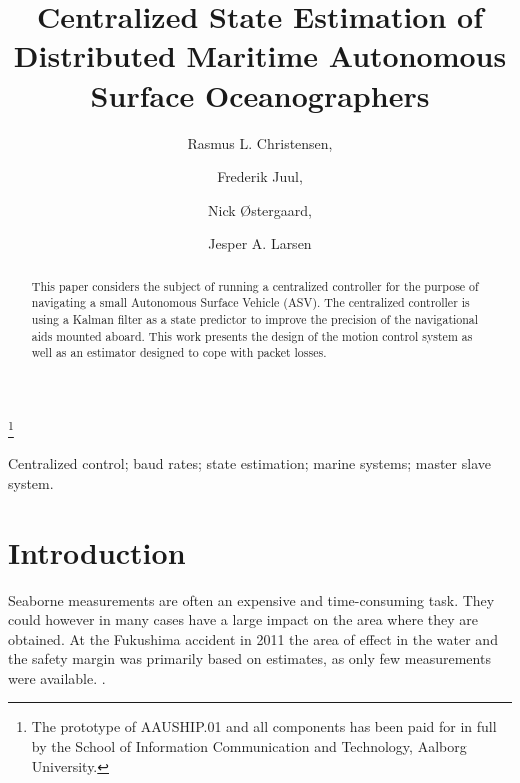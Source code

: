 \documentclass{ifacconf}
\begin{document}
\begin{frontmatter}

\title{Centralized State Estimation of Distributed Maritime Autonomous Surface Oceanographers} %

\thanks[footnoteinfo]{The prototype of AAUSHIP.01 and all components has been paid for in full by the School of Information Communication and Technology, Aalborg University.}

\author{Rasmus L. Christensen,} 
\author{Frederik Juul,} 
\author{Nick \O stergaard,}
\author{Jesper A. Larsen}
\address{Section of Automation and Control, Department of Electronic Systems, Aalborg University, Fredrik Bajers Vej 7, 9220 Aalborg \O st, Denmark (e-mail: \{ralch,nickoe,fjuul,jal\}@es.aau.dk)}                                            
          
\begin{keyword}                           %
Centralized control; baud rates; state estimation; marine systems; master slave system.              %
\end{keyword}                             %


\begin{abstract}                          %
This paper considers the subject of running a centralized controller for the purpose of navigating a small Autonomous Surface Vehicle (ASV). The centralized controller is using a Kalman filter as a state predictor to improve the precision of the navigational aids mounted aboard. This work presents the design of the motion control system as well as an estimator designed to cope with packet losses. 
\end{abstract}

\end{frontmatter}

\section{Introduction}
Seaborne measurements are often an expensive and time-consuming task. They could however in many cases have a large impact on the area where they are obtained. At the Fukushima accident in 2011 the area of effect in the water and the safety margin was primarily based on estimates, as only few measurements were available. \cite{energy}.
\end{document}
